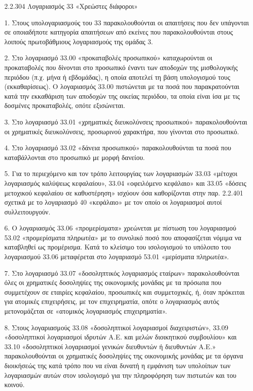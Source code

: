 \documentclass[A4,10pt,greek]{book}
\begin{document}
2.2.304 Λογαριασμός 33 «Χρεώστες διάφοροι»

1. Στους υπολογαριασμούς του 33 παρακολουθούνται οι απαιτήσεις που δεν υπάγονται σε οποιαδήποτε κατηγορία απαιτήσεων από εκείνες που παρακολουθούνται στους λοιπούς πρωτοβάθμιους λογαριασμούς της ομάδας 3.

2. Στο λογαριασμό 33.00 «προκαταβολές προσωπικού» καταχωρούνται οι προκαταβολές που δίνονται στο προσωπικό έναντι των αποδοχών της μισθολογικής περιόδου (π.χ.  μήνα ή εβδομάδας), η οποία αποτελεί τη βάση υπολογισμού τους (εκκαθαρίσεως). Ο λογαριασμός 33.00 πιστώνεται με τα ποσά που παρακρατούνται κατά την εκκαθάριση των αποδοχών της οικείας περιόδου, τα οποία είναι ίσα με τις δοσμένες προκαταβολές, οπότε εξισώνεται.

3. Στο λογαριασμό 33.01 «χρηματικές διευκολύνσεις προσωπικού» παρακολουθούνται οι χρηματικές διευκολύνσεις, προσωρινού χαρακτήρα, που γίνονται στο προσωπικό.

4. Στο λογαριασμό 33.02 «δάνεια προσωπικού» παρακολουθούνται τα ποσά που καταβάλλονται στο προσωπικό με μορφή δανείου.

5. Για το περιεχόμενο και τον τρόπο λειτουργίας των λογαριασμών 33.03 «μέτοχοι λογαριασμός καλύψεως κεφαλαίου», 33.04 «οφειλόμενο κεφάλαιο» και 33.05 «δόσεις μετοχικού κεφαλαίου σε καθυστέρηση» ισχύουν όσα καθορίζονται στην παρ. 2.2.401 σχετικά με το λογαριασμό 40 «κεφάλαιο» με τον οποίο οι λογαριασμοί αυτοί συλλειτουργούν.

6. Ο λογαριασμός 33.06 «προμερίσματα» χρεώνεται με πίστωση του λογαριασμού 53.02 «προμερίσματα πληρωτέα» με το συνολικό ποσό που αποφασίζεται νόμιμα να καταβληθεί ως προμέρισμα. Κατά το κλείσιμο του ισολογισμού το υπόλοιπο του λογαριασμού 33.06 μεταφέρεται στο λογαριασμό 53.01 «μερίσματα πληρωτέα».

7. Στο λογαριασμό 33.07 «δοσοληπτικός λογαριασμός εταίρων» παρακολουθούνται όλες οι χρηματικές δοσοληψίες της οικονομικής μονάδας με τα πρόσωπα που συμμετέχουν σε εταιρίες κεφαλαίου, προσωπικές και συμμετοχικές, ή, όταν πρόκειται για ατομικές επιχειρήσεις, με τον επιχειρηματία, οπότε ο λογαριασμός αυτός μετονομάζεται σε «ατομικός λογαριασμός επιχειρηματία».

8. Στους λογαριασμούς 33.08 «δοσοληπτικοί λογαριασμοί διαχειριστών», 33.09 «δοσοληπτικοί λογαριασμοί ιδρυτών Α.Ε. και μελών διοικητικού συμβουλίου» και 33.10 «δοσοληπτικοί λογαριασμοί γενικών διευθυντών ή διευθυντών Α.Ε.» παρακολουθούνται οι χρηματικές δοσοληψίες της οικονομικής μονάδας με τα όργανα διοικήσεώς της κατά τρόπο που να είναι δυνατή η εμφάνιση των υπολοίπων των λογαριασμών αυτών στον ισολογισμό για την πληροφόρηση των πιστωτών και του κοινού.
\end{document}
